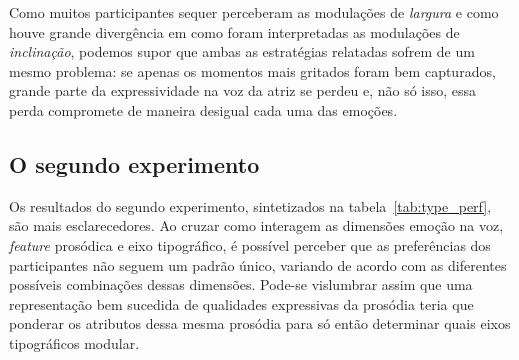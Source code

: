 \documentclass[a4paper]{tufte-handout}
\begin{document}
Como muitos participantes sequer perceberam as modulações de \textit{largura} e como houve grande divergência em como foram interpretadas as modulações de \textit{inclinação}, podemos supor que ambas as estratégias relatadas sofrem de um mesmo problema: se apenas os momentos mais gritados foram bem capturados, grande parte da expressividade na voz da atriz se perdeu e, não só isso, essa perda compromete de maneira desigual cada uma das emoções.

\pagebreak

\subsection{O segundo experimento}

Os resultados do segundo experimento, sintetizados na tabela~\ref{tab:type_perf}, são mais esclarecedores. Ao cruzar como interagem as dimensões emoção na voz, \textit{feature} prosódica e eixo tipográfico, é possível perceber que as preferências dos participantes não seguem um padrão único, variando de acordo com as diferentes possíveis combinações dessas dimensões. Pode-se vislumbrar assim que uma representação bem sucedida de qualidades expressivas da prosódia teria que ponderar os atributos dessa mesma prosódia para só então determinar quais eixos tipográficos modular.
\end{document}
